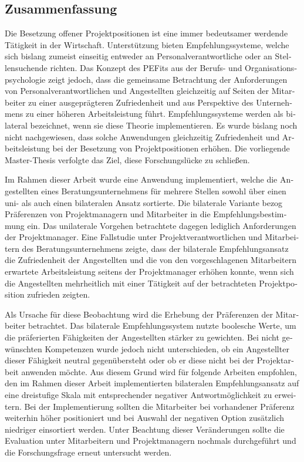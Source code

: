 \begin{otherlanguage}{ngerman}
\chapter*{Zusammenfassung}
Die Besetzung offener Projektpositionen ist eine immer bedeutsamer werdende Tätigkeit in der Wirtschaft. Unterstützung bieten Empfehlungssysteme, welche sich bislang zumeist einseitig entweder an Personalverantwortliche oder an Stellensuchende richten. Das Konzept des \aclp{PEFit} aus der Berufs- und Organisationspsychologie zeigt jedoch, dass die gemeinsame Betrachtung der Anforderungen von Personalverantwortlichen und Angestellten gleichzeitig auf Seiten der Mitarbeiter zu einer ausgeprägteren Zufriedenheit und aus Perspektive des Unternehmens zu einer höheren Arbeitsleistung führt. Empfehlungssysteme werden als bilateral bezeichnet, wenn sie diese Theorie implementieren. Es wurde bislang noch nicht nachgewiesen, dass solche Anwendungen gleichzeitig Zufriedenheit und Arbeitsleistung bei der Besetzung von Projektpositionen erhöhen. Die vorliegende Master-Thesis verfolgte das Ziel, diese Forschungslücke zu schließen.

Im Rahmen dieser Arbeit wurde eine Anwendung implementiert, welche die Angestellten eines Beratungsunternehmens für mehrere Stellen sowohl über einen uni- als auch einen bilateralen Ansatz sortierte. Die bilaterale Variante bezog Präferenzen von Projektmanagern und Mitarbeiter in die Empfehlungsbestimmung ein. Das unilaterale Vorgehen betrachtete dagegen lediglich Anforderungen der Projektmanager. Eine Fallstudie unter Projektverantwortlichen und Mitarbeitern des Beratungsunternehmens zeigte, dass der bilaterale Empfehlungsansatz die Zufriedenheit der Angestellten und die von den vorgeschlagenen Mitarbeitern erwartete Arbeitsleistung seitens der Projektmanager erhöhen konnte, wenn sich die Angestellten mehrheitlich mit einer Tätigkeit auf der betrachteten Projektposition zufrieden zeigten.

Als Ursache für diese Beobachtung wird die Erhebung der Präferenzen der Mitarbeiter betrachtet. Das bilaterale Empfehlungssystem nutzte boolesche Werte, um die präferierten Fähigkeiten der Angestellten stärker zu gewichten. Bei nicht gewünschten Kompetenzen wurde jedoch nicht unterschieden, ob ein Angestellter dieser Fähigkeit neutral gegenübersteht oder ob er diese nicht bei der Projektarbeit anwenden möchte. Aus diesem Grund wird für folgende Arbeiten empfohlen, den im Rahmen dieser Arbeit implementierten bilateralen Empfehlungsansatz auf eine dreistufige Skala mit entsprechender negativer Antwortmöglichkeit zu erweitern. Bei der Implementierung sollten die Mitarbeiter bei vorhandener Präferenz weiterhin höher positioniert und bei Auswahl der negativen Option zusätzlich niedriger einsortiert werden. Unter Beachtung dieser Veränderungen sollte die Evaluation unter Mitarbeitern und Projektmanagern nochmals durchgeführt und die Forschungsfrage erneut untersucht werden.
\end{otherlanguage}

